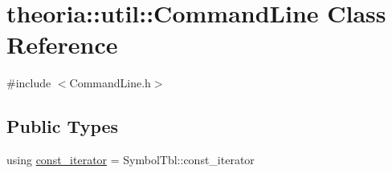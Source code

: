 \hypertarget{classtheoria_1_1util_1_1CommandLine}{}\section{theoria\+:\+:util\+:\+:Command\+Line Class Reference}
\label{classtheoria_1_1util_1_1CommandLine}


{\ttfamily \#include $<$Command\+Line.\+h$>$}

\subsection*{Public Types}
\begin{DoxyCompactItemize}
\item 
using \hyperlink{classtheoria_1_1util_1_1CommandLine_a729aa00feedd8257d4caafc73ac6ee63}{const\+\_\+iterator} = Symbol\+Tbl\+::const\+\_\+iterator
\end{DoxyCompactItemize}
